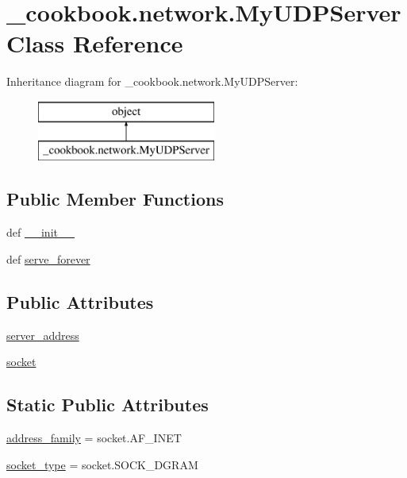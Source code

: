 \hypertarget{class__cookbook_1_1network_1_1MyUDPServer}{\section{\-\_\-cookbook.\-network.\-My\-U\-D\-P\-Server Class Reference}
\label{class__cookbook_1_1network_1_1MyUDPServer}
}
Inheritance diagram for \-\_\-cookbook.\-network.\-My\-U\-D\-P\-Server\-:\begin{figure}[H]
\begin{center}
\leavevmode
\includegraphics[height=2.000000cm]{d0/d63/class__cookbook_1_1network_1_1MyUDPServer}
\end{center}
\end{figure}
\subsection*{Public Member Functions}
\begin{DoxyCompactItemize}
\item 
def \hyperlink{class__cookbook_1_1network_1_1MyUDPServer_a5fd05dec49b0b2be004d5de49b22fc27}{\-\_\-\-\_\-init\-\_\-\-\_\-}
\item 
def \hyperlink{class__cookbook_1_1network_1_1MyUDPServer_a1463759224a77649cd1ba2f4bf6fba8d}{serve\-\_\-forever}
\end{DoxyCompactItemize}
\subsection*{Public Attributes}
\begin{DoxyCompactItemize}
\item 
\hyperlink{class__cookbook_1_1network_1_1MyUDPServer_aed17e4556fb33e07bc8a348aedf63ae4}{server\-\_\-address}
\item 
\hyperlink{class__cookbook_1_1network_1_1MyUDPServer_aeae33e7df31d329cd74f78f195b5753b}{socket}
\end{DoxyCompactItemize}
\subsection*{Static Public Attributes}
\begin{DoxyCompactItemize}
\item 
\hyperlink{class__cookbook_1_1network_1_1MyUDPServer_a4b7d2c6b542b30c47bf020647b8685f9}{address\-\_\-family} = socket.\-A\-F\-\_\-\-I\-N\-E\-T
\item 
\hyperlink{class__cookbook_1_1network_1_1MyUDPServer_ad01d41f36b9e554d7ca247c3ab677511}{socket\-\_\-type} = socket.\-S\-O\-C\-K\-\_\-\-D\-G\-R\-A\-M
\end{DoxyCompactItemize}

